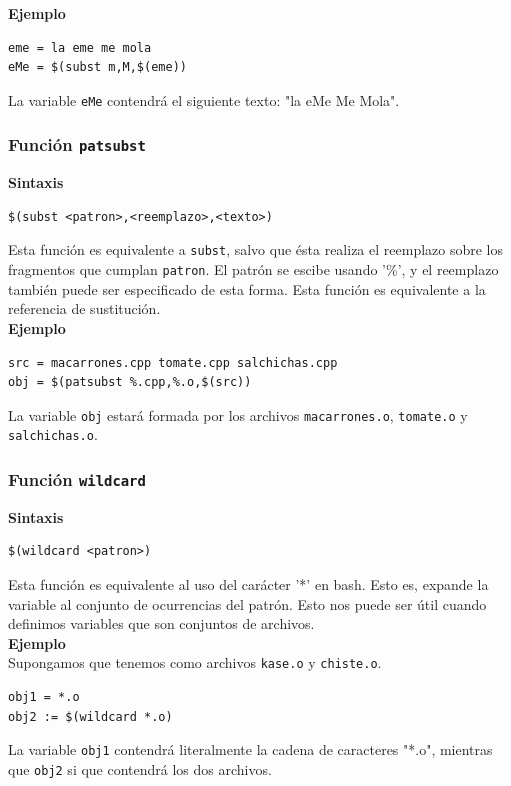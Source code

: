 \documentclass[11pt,twoside,titlepage,a4paper]{article}
\theoremstyle{definition}
\theoremstyle{plain_rojo}
\theoremstyle{remark}
\begin{document}
\textbf{\textcolor{burdeos}{Ejemplo}}
\begin{lstlisting}
eme = la eme me mola
eMe = $(subst m,M,$(eme))
\end{lstlisting}
La variable \texttt{eMe} contendrá el siguiente texto: "la eMe Me Mola".

\subsubsection{Función \texttt{patsubst}}

\textbf{\textcolor{burdeos}{Sintaxis}}
\begin{lstlisting}
$(subst <patron>,<reemplazo>,<texto>)
\end{lstlisting}
Esta función es equivalente a \texttt{subst}, salvo que ésta realiza el 
reemplazo sobre los fragmentos que cumplan \texttt{patron}. El patrón se 
escibe usando '\%', y el reemplazo también puede ser especificado de esta 
forma. Esta función es equivalente a la referencia de sustitución.
\\

\textbf{\textcolor{burdeos}{Ejemplo}}
\begin{lstlisting}
src = macarrones.cpp tomate.cpp salchichas.cpp
obj = $(patsubst %.cpp,%.o,$(src))
\end{lstlisting}
La variable \texttt{obj} estará formada por los archivos
\texttt{macarrones.o}, \texttt{tomate.o} y \texttt{salchichas.o}.

\subsubsection{Función \texttt{wildcard}}

\textbf{\textcolor{burdeos}{Sintaxis}}
\begin{lstlisting}
$(wildcard <patron>)
\end{lstlisting}
Esta función es equivalente al uso del carácter '*' en bash. Esto es, expande
la variable al conjunto de ocurrencias del patrón. Esto nos puede ser útil
cuando definimos variables que son conjuntos de archivos.
\\

\textbf{\textcolor{burdeos}{Ejemplo}}
\\Supongamos que tenemos como archivos \texttt{kase.o} y \texttt{chiste.o}.
\begin{lstlisting}
obj1 = *.o
obj2 := $(wildcard *.o)
\end{lstlisting}
La variable \texttt{obj1} contendrá literalmente la cadena de caracteres 
"*.o", mientras que \texttt{obj2} si que contendrá los dos archivos.
\end{document}
